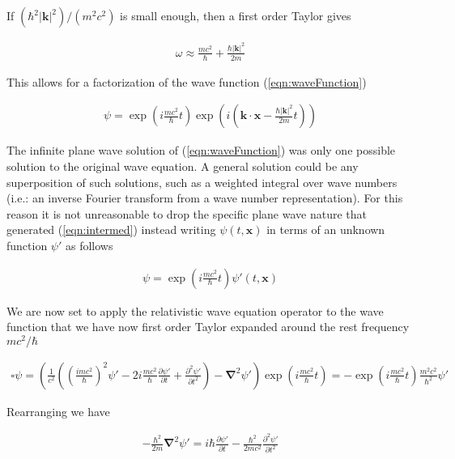 \documentclass[]{eliblog}
\newcommand{\Abs}[1]{{\left\lvert{#1}\right\rvert}}
\newcommand{\Bk}[0]{\mathbf{k}}
\newcommand{\Bx}[0]{\mathbf{x}}
\newcommand{\spacegrad}[0]{\boldsymbol{\nabla}}
\newcommand{\delambertian}[0]{\square}
\begin{document}
If $(\hbar^2 \Abs{\Bk}^2)/(m^2 c^2)$ is small enough, then a first order Taylor gives

\begin{align}
\omega \approx \frac{m c^2}{\hbar} + \frac{\hbar \Abs{\Bk}^2}{2 m}
\end{align}

This allows for a factorization of the wave function (\ref{eqn:waveFunction})

\begin{align}\label{eqn:intermed}
\psi =
\exp\left( i \frac{m c^2}{\hbar} t \right)
\exp\left( i \left(
\Bk \cdot \Bx
-\frac{\hbar \Abs{\Bk}^2}{2 m}t
\right) \right)
\end{align}

The infinite plane wave solution of (\ref{eqn:waveFunction}) was only one possible solution to the original wave equation.
A general solution could be any superposition of such solutions, such as a weighted integral over wave numbers (i.e.: an
inverse Fourier transform from a wave number representation).  For this reason it is not unreasonable to drop the specific plane wave nature that generated (\ref{eqn:intermed}) instead writing $\psi(t,\Bx)$ in terms of an unknown function $\psi'$ as follows

\begin{align}
\psi = \exp\left( i \frac{m c^2}{\hbar} t \right) \psi'(t, \Bx)
\end{align}

We are now set to apply the relativistic wave equation operator to the wave function that we have now first order Taylor expanded
around the rest frequency $m c^2/\hbar$

\begin{align}
\delambertian \psi
=
\left(
\frac{1}{c^2}
\left(
\left( \frac{i m c^2}{\hbar} \right)^2 \psi' - 2 i \frac{m c^2}{\hbar} \frac{\partial \psi'}{\partial t} +
\frac{\partial^2 \psi'}{\partial t^2}
\right)
-
\spacegrad^2 \psi'
\right)
\exp\left( i \frac{m c^2}{\hbar} t \right)
= -
\exp\left( i \frac{m c^2}{\hbar} t \right)
\frac{m^2 c^2}{\hbar^2} \psi'
\end{align}

Rearranging we have

\begin{align}
-\frac{\hbar^2}{2m} \spacegrad^2 \psi' = i \hbar \frac{\partial \psi'}{\partial t} -\frac{\hbar^2}{2m c^2} \frac{\partial^2 \psi'}{\partial t^2}
\end{align}
\end{document}
